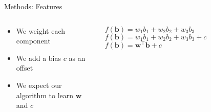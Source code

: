 \begin{slide}{Methods: Features}
  \begin{columns}
  \begin{column}{0.55\textwidth}
  \begin{itemize}
    \item<1-> We weight each component
    \item<2-> We add a bias $c$ as an offset %
    \item<3-> We expect our algorithm to learn $\mathbf{w}$ and $c$%
  \end{itemize}
  \end{column}
  \begin{column}{0.45\textwidth}
    \centering
     {$f(\mathbf{b}) = w_1b_1 + w_2b_2 + w_3b_3$}
     {$f(\mathbf{b}) = w_1b_1 + w_2b_2 + w_3b_3 + c$}
     {$f(\mathbf{b}) = \mathbf{w}^\top\mathbf{b} + c$}
  \end{column}
\end{columns}
\end{slide}

